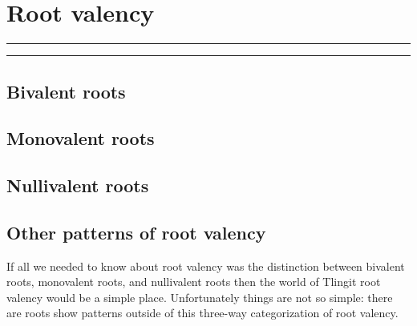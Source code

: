 
\resetexcnt
\chapter{Root valency}\label{ch:rootval}

\startcontents[chapters]
\noindent\rule[0.5em]{\textwidth}{\heavyrulewidth}
\noindent\rule{\textwidth}{\heavyrulewidth}
\vspace{1\baselineskip}


\section{Bivalent roots}\label{sec:rootval-bi}

\section{Monovalent roots}\label{sec:rootval-mono}

\section{Nullivalent roots}\label{sec:rootval-null}

\section{Other patterns of root valency}\label{sec:rootval-other}

If all we needed to know about root valency was the distinction between bivalent roots, monovalent roots, and nullivalent roots then the world of Tlingit root valency would be a simple place. Unfortunately things are not so simple: there are roots show patterns outside of this three-way categorization of root valency.

\stopcontents[chapters]